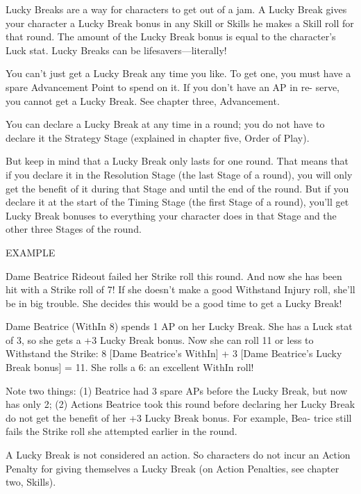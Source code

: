 \documentclass[11pt,twocolumn]{book}
\begin{document}
Lucky Breaks are a way for characters to get out of a jam. A Lucky Break gives your character a Lucky Break bonus in any Skill or Skills he makes a Skill roll for that round. The amount of the Lucky Break bonus is equal to the character’s Luck stat. Lucky Breaks can be lifesavers—literally!

You can’t just get a Lucky Break any time you like. To get one, you must have a spare Advancement Point to spend on it. If you don’t have an AP in re- serve, you cannot get a Lucky Break. See chapter three, Advancement.

You can declare a Lucky Break at any time in a round; you do not have to declare it the Strategy Stage (explained in chapter five, Order of Play). 

But keep in mind that a Lucky Break only lasts for one round. That means that if you declare it in the Resolution Stage (the last Stage of a round), you will only get the benefit of it during that Stage and until the end of the round. But if you declare it at the start of the Timing Stage (the first Stage of a round), you’ll get Lucky Break bonuses to everything your character does in that Stage and the other three Stages of the round.

\begin{mdframed}
EXAMPLE

Dame Beatrice Rideout failed her Strike roll this round. And now she has been hit with a Strike roll of 7! If she doesn’t make a good Withstand Injury roll, she’ll be in big trouble. She decides this would be a good time to get a Lucky Break!

Dame Beatrice (WithIn 8) spends 1 AP on her Lucky Break. She has a Luck stat of 3, so she gets a +3 Lucky Break bonus. Now she can roll 11 or less to Withstand the Strike: 8 [Dame Beatrice’s WithIn] + 3 [Dame Beatrice’s Lucky Break bonus] = 11. She rolls a 6: an excellent WithIn roll!

Note two things: (1) Beatrice had 3 spare APs before the Lucky Break, but now has only 2; (2) Actions Beatrice took this round before declaring her Lucky Break do not get the benefit of her +3 Lucky Break bonus. For example, Bea- trice still fails the Strike roll she attempted earlier in the round.
\end{mdframed}

A Lucky Break is not considered an action. So characters do not incur an Action Penalty for giving themselves a Lucky Break (on Action Penalties, see chapter two, Skills).
\end{document}
